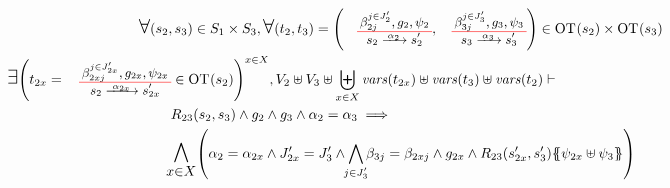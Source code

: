 \documentclass[runningheads]{llncs}
\begin{document}
\begin{enumerate}
\begin{multline*}
\bigforall \mpar{s_2, s_3} \in S_1 \times S_3, \bigsymb{\forall} \mpar{t_2, t_3} = \mpar{\OTx{2}{}{2}{2}, \OTx{3}{}{3}{3}} \in \fOT{s_2} \times \fOT{s_3} \\ 
\bigsymb{\bigexists} 
\mpar{t_{2x} = \OTx{2}{x}{2x}{2x} \in \fOT{s_2}}^{x \in X},
V_2 \uplus V_3\uplus \biguplus_{x\in X}\fvars{t_{2x}} \uplus \fvars{t_3} \uplus \fvars{t_2} \vdash \hspace{6cm}\\  R_{23}\mpar{s_2, s_3} \wedge 	g_2 \wedge g_3 \wedge \alpha_2 = \alpha_3 
\implies \hspace{6cm}\\
\bigsymb{\bigwedge_{x\in X}}
\mpar{
\alpha_2=\alpha_{2 x}  \land J'_{2x}= J'_3 \land \bigwedge_\subbox{j \in J'_3 } \beta_{3j} = \beta_{2xj}\land g_{2 x}\land
 R_{23}\mpar{s'_{2 x}, s'_3}\psubst{\psi_{2 x} \uplus \psi_3}}\\
\end{multline*}






\end{enumerate}
\end{document}
